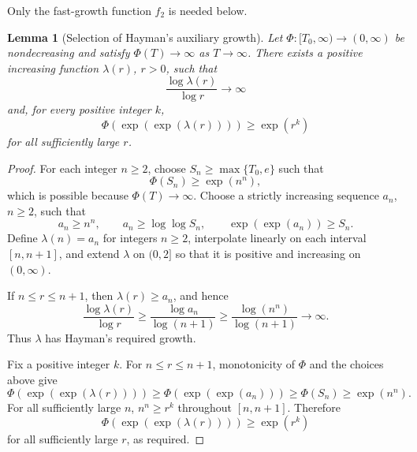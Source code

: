 \documentclass[11pt]{article}
\newtheorem{lemma}{Lemma}
\begin{document}
Only the fast-growth function \(f_2\) is needed below.

\begin{lemma}[Selection of Hayman's auxiliary growth]\label{lem:hayman-selection}
Let \(\Phi:[T_0,\infty)\to(0,\infty)\) be nondecreasing and satisfy
\(\Phi(T)\to\infty\) as \(T\to\infty\).  There exists a positive increasing
function \(\lambda(r)\), \(r>0\), such that
\[
\frac{\log \lambda(r)}{\log r}\to\infty
\]
and, for every positive integer \(k\),
\[
\Phi(\exp(\exp(\lambda(r))))\ge \exp(r^k)
\]
for all sufficiently large \(r\).
\end{lemma}

\begin{proof}
For each integer \(n\ge 2\), choose \(S_n\ge \max\{T_0,e\}\) such that
\[
\Phi(S_n)\ge \exp(n^n),
\]
which is possible because \(\Phi(T)\to\infty\).  Choose a strictly increasing
sequence \(a_n\), \(n\ge 2\), such that
\[
a_n\ge n^n,
\qquad
a_n\ge \log\log S_n,
\qquad
\exp(\exp(a_n))\ge S_n.
\]
Define \(\lambda(n)=a_n\) for integers \(n\ge 2\), interpolate linearly on each
interval \([n,n+1]\), and extend \(\lambda\) on \((0,2]\) so that it is positive
and increasing on \((0,\infty)\).

If \(n\le r\le n+1\), then \(\lambda(r)\ge a_n\), and hence
\[
\frac{\log \lambda(r)}{\log r}
\ge
\frac{\log a_n}{\log(n+1)}
\ge
\frac{\log(n^n)}{\log(n+1)}
\to\infty .
\]
Thus \(\lambda\) has Hayman's required growth.

Fix a positive integer \(k\).  For \(n\le r\le n+1\), monotonicity of \(\Phi\)
and the choices above give
\[
\Phi(\exp(\exp(\lambda(r))))
\ge
\Phi(\exp(\exp(a_n)))
\ge
\Phi(S_n)
\ge
\exp(n^n).
\]
For all sufficiently large \(n\), \(n^n\ge r^k\) throughout
\([n,n+1]\).  Therefore
\[
\Phi(\exp(\exp(\lambda(r))))\ge \exp(r^k)
\]
for all sufficiently large \(r\), as required.
\end{proof}
\end{document}
